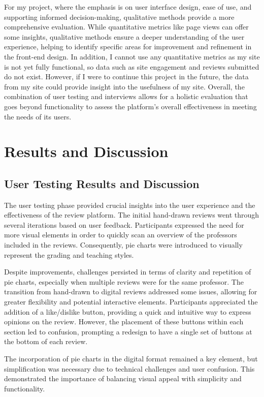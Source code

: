 \documentclass[10pt,twocolumn]{article}
\begin{document}
For my project, where the emphasis is on user interface design, ease of use, and supporting informed decision-making, qualitative methods provide a more comprehensive evaluation. While quantitative metrics like page views can offer some insights, qualitative methods ensure a deeper understanding of the user experience, helping to identify specific areas for improvement and refinement in the front-end design. In addition, I cannot use any quantitative metrics as my site is not yet fully functional, so data such as site engagement and reviews submitted do not exist. However, if I were to continue this project in the future, the data from my site could provide insight into the usefulness of my site. Overall, the combination of user testing and interviews allows for a holistic evaluation that goes beyond functionality to assess the platform's overall effectiveness in meeting the needs of its users.


\section{Results and Discussion}

\subsection{User Testing Results and Discussion}

The user testing phase provided crucial insights into the user experience and the effectiveness of the review platform. The initial hand-drawn reviews went through several iterations based on user feedback. Participants expressed the need for more visual elements in order to quickly scan an overview of the professors included in the reviews. Consequently, pie charts were introduced to visually represent the grading and teaching styles.

Despite improvements, challenges persisted in terms of clarity and repetition of pie charts, especially when multiple reviews were for the same professor. The transition from hand-drawn to digital reviews addressed some issues, allowing for greater flexibility and potential interactive elements. Participants appreciated the addition of a like/dislike button, providing a quick and intuitive way to express opinions on the review. However, the placement of these buttons within each section led to confusion, prompting a redesign to have a single set of buttons at the bottom of each review.

The incorporation of pie charts in the digital format remained a key element, but simplification was necessary due to technical challenges and user confusion. This demonstrated the importance of balancing visual appeal with simplicity and functionality.
\end{document}
